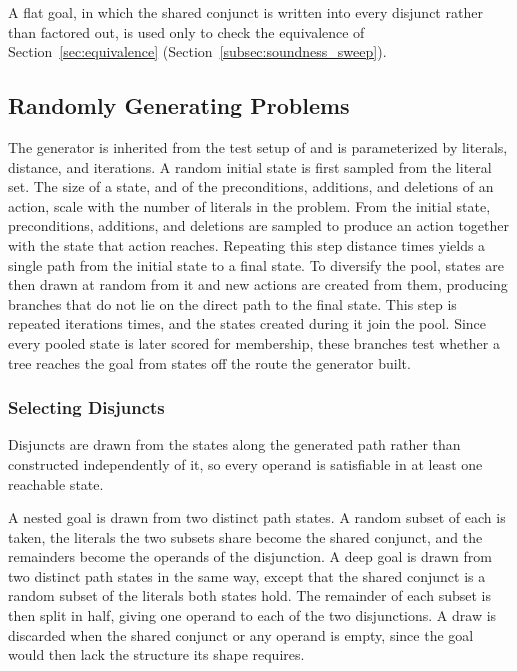     A flat goal, in which the shared conjunct is written into every disjunct rather than factored out, is used only to check the equivalence of Section~\ref{sec:equivalence} (Section~\ref{subsec:soundness_sweep}).

    \subsection{Randomly Generating Problems}
    \label{subsec:random_generator}

    
    
    The generator is inherited from the test setup of \cite{cai2021} and is parameterized by literals, distance, and iterations.
    A random initial state is first sampled from the literal set.
    The size of a state, and of the preconditions, additions, and deletions of an action, scale with the number of literals in the problem.
    From the initial state, preconditions, additions, and deletions are sampled to produce an action together with the state that action reaches.
    Repeating this step distance times yields a single path from the initial state to a final state.
    To diversify the pool, states are then drawn at random from it and new actions are created from them, producing branches that do not lie on the direct path to the final state.
    This step is repeated iterations times, and the states created during it join the pool.
    Since every pooled state is later scored for membership, these branches test whether a tree reaches the goal from states off the route the generator built.

    \subsubsection{Selecting Disjuncts}
    \label{subsubsec:disjunct_selection}
    \label{subsubsec:reproducibility}
    Disjuncts are drawn from the states along the generated path rather than constructed independently of it, so every operand is satisfiable in at least one reachable state.

    A nested goal is drawn from two distinct path states.
    A random subset of each is taken, the literals the two subsets share become the shared conjunct, and the remainders become the operands of the disjunction.
    A deep goal is drawn from two distinct path states in the same way, except that the shared conjunct is a random subset of the literals both states hold.
    The remainder of each subset is then split in half, giving one operand to each of the two disjunctions.
    A draw is discarded when the shared conjunct or any operand is empty, since the goal would then lack the structure its shape requires.

